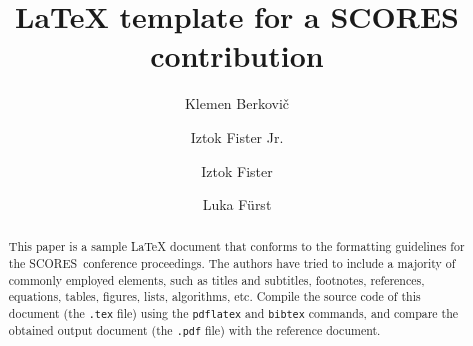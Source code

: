\documentclass[sigconf]{acmart}
\newcommand{\scores}{\textsc{SCORES}}
\begin{document}
\title{\LaTeX{} template for a \scores{} contribution}


\author{Klemen Berkovi\v{c}}

\author{Iztok Fister Jr.}

\author{Iztok Fister}

\author{Luka F\"{u}rst}

\begin{abstract}
    This paper is a sample \LaTeX{} document that conforms to the formatting
    guidelines for the \scores\ conference proceedings.  The authors have
    tried to include a majority of commonly employed elements, such as titles
    and subtitles, footnotes, references, equations, tables, figures, lists,
    algorithms, etc.  Compile the source code of this document (the
    \texttt{.tex} file) using the \texttt{pdflatex} and \texttt{bibtex}
    commands, and compare the obtained output document (the \texttt{.pdf}
    file) with the reference document.
\end{abstract}
\end{document}
